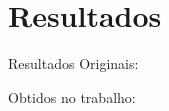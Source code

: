 
\section{Resultados}

\begin{frame}{Resultados}
    Originais:
    \begin{small}
        
    \end{small}
    \vskip10pt
    Obtidos no trabalho:
    \begin{small}
        
    \end{small}
\end{frame}
